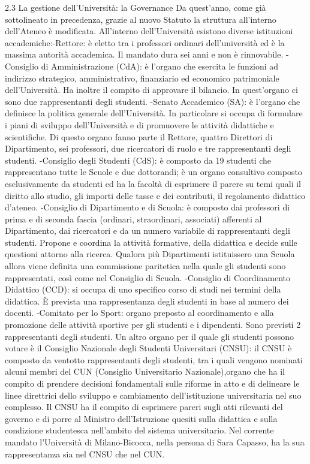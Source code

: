 2.3 La gestione dell’Università: la Governance 
Da quest'anno, come già sottolineato in precedenza, grazie al nuovo Statuto la struttura all'interno dell'Ateneo è modificata. All’interno dell’Università esistono diverse istituzioni accademiche:-Rettore: è eletto tra i professori ordinari dell’università ed è la massima autorità accademica. Il mandato dura sei anni e non è rinnovabile.
       -Consiglio di Amministrazione (CdA): è l'organo che esercita le funzioni ad indirizzo strategico,  amministrativo, finanziario ed economico patrimoniale dell'Università. Ha inoltre il compito di approvare il bilancio. In quest'organo ci sono due rappresentanti degli studenti.
       -Senato Accademico (SA): è l'organo che definisce la politica generale dell'Università. In particolare si occupa di formulare i piani di sviluppo dell'Università e di promuovere le attività didattiche e scientifiche. Di questo organo fanno parte il Rettore, quattro Direttori di Dipartimento, sei professori, due ricercatori di ruolo e tre rappresentanti degli studenti.
       -Consiglio degli Studenti (CdS): è composto da 19 studenti che rappresentano tutte le Scuole e due dottorandi; è un organo consultivo composto esclusivamente da studenti ed ha la facoltà di esprimere il parere su temi quali il diritto allo studio, gli importi delle tasse e dei contributi, il regolamento didattico d’ateneo.
       -Consiglio di Dipartimento e di Scuola: è composto dai professori di prima e di seconda fascia (ordinari, straordinari, associati) afferenti al Dipartimento, dai ricercatori e da un numero variabile di rappresentanti degli studenti. Propone e coordina la attività formative, della didattica e decide sulle questioni attorno alla ricerca. Qualora più Dipartimenti istituissero una Scuola allora viene definita una commissione paritetica nella quale gli studenti sono rappresentati, così come nel Consiglio di Scuola.
       -Consiglio di Coordinamento Didattico (CCD): si occupa di uno specifico corso di studi nei termini della didattica. È prevista una rappresentanza degli studenti in base al numero dei docenti.
       -Comitato per lo Sport: organo preposto al coordinamento e alla promozione delle attività sportive per gli studenti e i dipendenti. Sono previsti 2 rappresentanti degli studenti.
Un altro organo per il quale gli studenti possono votare è il Consiglio Nazionale degli Studenti Universitari (CNSU): il CNSU è composto da ventotto rappresentanti degli studenti, tra i quali vengono nominati alcuni membri del CUN (Consiglio Universitario Nazionale),organo che ha il compito di prendere decisioni fondamentali sulle riforme in atto e di delineare le linee direttrici dello sviluppo e cambiamento dell'istituzione universitaria nel suo complesso. Il CNSU ha il compito di esprimere pareri sugli atti rilevanti del governo e di porre al Ministro dell'Istruzione quesiti sulla didattica e  sulla condizione studentesca nell'ambito del sistema universitario. Nel corrente mandato l’Università di Milano-Bicocca, nella persona di Sara Capasso, ha la sua rappresentanza sia nel CNSU che nel CUN. 

